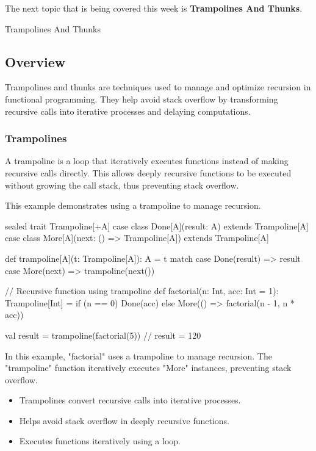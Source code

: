 The next topic that is being covered this week is \textbf{Trampolines And Thunks}.

\begin{notes}{Trampolines And Thunks}
    \subsection*{Overview}

    Trampolines and thunks are techniques used to manage and optimize recursion in functional programming. They help avoid stack overflow by transforming recursive calls into iterative processes and 
    delaying computations.
    
    \subsubsection*{Trampolines}
    
    A trampoline is a loop that iteratively executes functions instead of making recursive calls directly. This allows deeply recursive functions to be executed without growing the call stack, thus 
    preventing stack overflow.
    
    \begin{highlight}[Trampolines]
    
        This example demonstrates using a trampoline to manage recursion.
    
    \begin{code}[Scala]
    sealed trait Trampoline[+A]
    case class Done[A](result: A) extends Trampoline[A]
    case class More[A](next: () => Trampoline[A]) extends Trampoline[A]
    
    def trampoline[A](t: Trampoline[A]): A = t match {
        case Done(result) => result
        case More(next) => trampoline(next())
    }
    
    // Recursive function using trampoline
    def factorial(n: Int, acc: Int = 1): Trampoline[Int] =
        if (n == 0) Done(acc)
        else More(() => factorial(n - 1, n * acc))
    
    val result = trampoline(factorial(5))  // result = 120
    \end{code}
    
        In this example, "factorial" uses a trampoline to manage recursion. The "trampoline" function iteratively executes "More" instances, preventing stack overflow.
    
        \begin{itemize}
            \item Trampolines convert recursive calls into iterative processes.
            \item Helps avoid stack overflow in deeply recursive functions.
            \item Executes functions iteratively using a loop.
        \end{itemize}
    

\end{highlight}
\end{notes}
